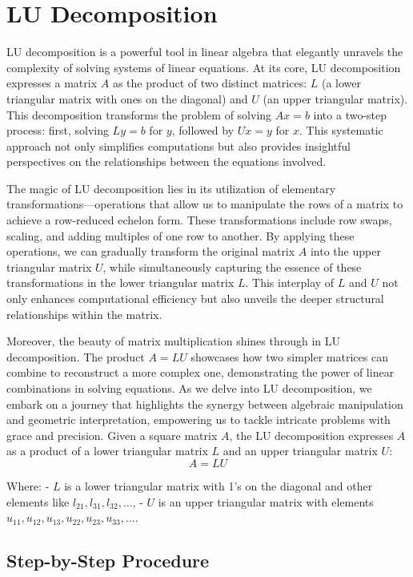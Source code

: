 \documentclass[
  letterpaper,
  DIV=11,
  numbers=noendperiod]{scrreprt}
\theoremstyle{plain}
\theoremstyle{definition}
\theoremstyle{remark}
\begin{document}
\section{LU Decomposition}\label{lu-decomposition}

LU decomposition is a powerful tool in linear algebra that elegantly
unravels the complexity of solving systems of linear equations. At its
core, LU decomposition expresses a matrix \(A\) as the product of two
distinct matrices: \(L\) (a lower triangular matrix with ones on the
diagonal) and \(U\) (an upper triangular matrix). This decomposition
transforms the problem of solving \(Ax = b\) into a two-step process:
first, solving \(Ly = b\) for \(y\), followed by \(Ux = y\) for \(x\).
This systematic approach not only simplifies computations but also
provides insightful perspectives on the relationships between the
equations involved.

The magic of LU decomposition lies in its utilization of elementary
transformations---operations that allow us to manipulate the rows of a
matrix to achieve a row-reduced echelon form. These transformations
include row swaps, scaling, and adding multiples of one row to another.
By applying these operations, we can gradually transform the original
matrix \(A\) into the upper triangular matrix \(U\), while
simultaneously capturing the essence of these transformations in the
lower triangular matrix \(L\). This interplay of \(L\) and \(U\) not
only enhances computational efficiency but also unveils the deeper
structural relationships within the matrix.

Moreover, the beauty of matrix multiplication shines through in LU
decomposition. The product \(A = LU\) showcases how two simpler matrices
can combine to reconstruct a more complex one, demonstrating the power
of linear combinations in solving equations. As we delve into LU
decomposition, we embark on a journey that highlights the synergy
between algebraic manipulation and geometric interpretation, empowering
us to tackle intricate problems with grace and precision. Given a square
matrix \(A\), the LU decomposition expresses \(A\) as a product of a
lower triangular matrix \(L\) and an upper triangular matrix \(U\):
\[A = LU\]

Where: - \(L\) is a lower triangular matrix with 1's on the diagonal and
other elements like \(l_{21}, l_{31}, l_{32}, \dots\), - \(U\) is an
upper triangular matrix with elements
\(u_{11}, u_{12}, u_{13}, u_{22}, u_{23}, u_{33}, \dots\).

\subsection{Step-by-Step Procedure}\label{step-by-step-procedure}
\end{document}
